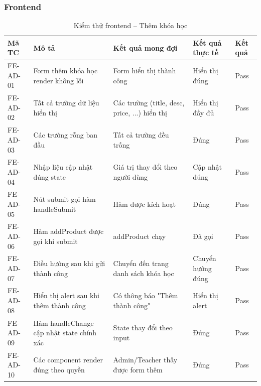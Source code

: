 \subsubsection{Frontend}
\begin{table}[H]
\centering
\caption{Kiểm thử frontend – Thêm khóa học}
\label{tab:fe_course}
\begin{tabular}{|p{1.8cm}|p{4cm}|p{4cm}|p{2.2cm}|p{1.5cm}|}
\hline
\textbf{Mã TC} & \textbf{Mô tả} & \textbf{Kết quả mong đợi} & \textbf{Kết quả thực tế} & \textbf{Kết quả} \\ \hline
FE-AD-01 & Form thêm khóa học render không lỗi & Form hiển thị thành công & Hiển thị đúng & Pass \\ \hline
FE-AD-02 & Tất cả trường dữ liệu hiển thị & Các trường (title, desc, price, ...) hiển thị & Hiển thị đầy đủ & Pass \\ \hline
FE-AD-03 & Các trường rỗng ban đầu & Tất cả trường đều trống & Đúng & Pass \\ \hline
FE-AD-04 & Nhập liệu cập nhật đúng state & Giá trị thay đổi theo người dùng & Cập nhật đúng & Pass \\ \hline
FE-AD-05 & Nút submit gọi hàm handleSubmit & Hàm được kích hoạt & Đúng & Pass \\ \hline
FE-AD-06 & Hàm addProduct được gọi khi submit & addProduct chạy & Đã gọi & Pass \\ \hline
FE-AD-07 & Điều hướng sau khi gửi thành công & Chuyển đến trang danh sách khóa học & Chuyển hướng đúng & Pass \\ \hline
FE-AD-08 & Hiển thị alert sau khi thêm thành công & Có thông báo "Thêm thành công" & Hiển thị alert & Pass \\ \hline
FE-AD-09 & Hàm handleChange cập nhật state chính xác & State thay đổi theo input & Đúng & Pass \\ \hline
FE-AD-10 & Các component render đúng theo quyền & Admin/Teacher thấy được form thêm & Đúng & Pass \\ \hline
\end{tabular}
\end{table}

